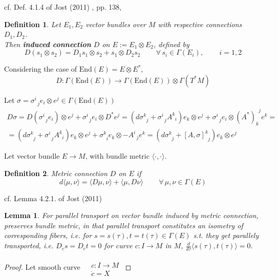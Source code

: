 \documentclass[10pt]{amsart}
\newtheorem{lemma}{Lemma}
\newtheorem{definition}{Definition}
\begin{document}
\begin{multicols*}{2}
cf. Def. 4.1.4 of Jost (2011) \cite{JJost2011}, pp. 138,
\begin{definition}
  Let $E_1, E_2$ vector bundles over $M$ with respective connections $D_1,D_2$.  \\
Then \textbf{induced connection} $D$ on $E:= E_1 \otimes E_2$, defined by 
\[
D(s_1 \otimes s_2) = D_1s_1 \otimes s_2 + s_1 \otimes D_2 s_2 \qquad \, \forall \, s_i \in \Gamma(E_i) , \qquad \, i = 1,2
\]
\end{definition}
Considering the case of $\text{End}(E) = E\otimes E^*$,
\[
D:\Gamma(\text{End}(E)) \to \Gamma(\text{End}(E)) \otimes \Gamma(T^*M)
\]

Let $\sigma = \sigma^i_{ \; \; j} e_i \otimes e^j \in \Gamma(\text{End}(E))$
\[
\begin{gathered}
  D\sigma = D(\sigma^i_{ \; \; j}e_i) \otimes e^j + \sigma^i_{ \; \; j} e_i \otimes D^* e^j = (d\sigma^k_{ \; \; j} + \sigma^i_{ \; \; j} A^k_{ \; \; i}) e_k \otimes e^j + \sigma^i_{ \; \; j} e_i \otimes (A^*)_k^{ \; \; j} e^k = \\
  = (d\sigma^k_{ \; \; j} + \sigma^i_{ \; \; j} A^k_{ \; \; i} )e_k \otimes e^j + \sigma^k_{ \; \; i} e_k \otimes -A^i_{ \; \; j} e^k = (d\sigma^k_{ \; \; j} + [A, \sigma]^k_{ \; \; j } ) e_k \otimes e^j
\end{gathered}
\]




Let vector bundle $E \to M$, with bundle metric $\langle \cdot , \cdot \rangle$.  

\begin{definition}
\emph{Metric connection} $D$ on $E$ if 
\[
d\langle \mu, \nu \rangle = \langle D\mu, \nu \rangle + \langle \mu, D\nu \rangle \qquad \, \forall \, \mu , \nu \in \Gamma(E)
\]
\end{definition}

cf. Lemma 4.2.1. of Jost (2011) \cite{JJost2011}
\begin{lemma}
  For parallel transport on vector bundle induced by metric connection, preserves bundle metric, in that parallel transport constitutes an isometry of corresponding fibers, i.e. for $s=s(\tau), t=t(\tau) \in \Gamma(E)$ s.t. they get parallely transported, i.e. $D_{\dot{c}}s = D_{\dot{c}}t =0$ for curve $c:I\to M$ \emph{in} $M$, $\frac{d}{d\tau} \langle s(\tau), t(\tau) \rangle =0$.  
\end{lemma}

\begin{proof}
  Let smooth curve $\begin{aligned} & \quad \\
    & c:I \to M \\
    & \dot{c} = X\end{aligned}$


\end{proof}
\end{multicols*}
\end{document}
